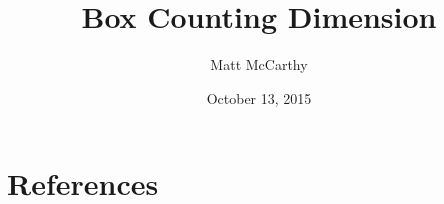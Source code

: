 \documentclass[12pt]{paper}
\title{Box Counting Dimension}
\date{October 13, 2015}
\author{Matt McCarthy}
\begin{document}
\maketitle



\section*{References}

\printbibliography
\end{document}
